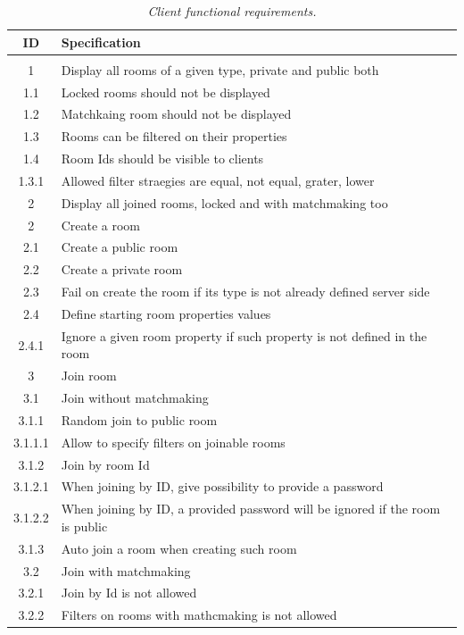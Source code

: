\begin{center}
\begin{longtable}{|c|l|} 
  \caption{\textit{Client functional requirements.}} \label{table:client-f-req} \\
 
\hline
ID   &  Specification \\
\hline
\multicolumn{2}{|c|}{} \\
\hline
1       & Display all rooms of a given type, private and public both \\
1.1     & Locked rooms should not be displayed \\
1.2     & Matchkaing room should not be displayed \\
1.3     & Rooms can be filtered on their properties \\
1.4     & Room Ids should be visible to clients \\
1.3.1   & Allowed filter straegies are equal, not equal, grater, lower \\
2       & Display all joined rooms, locked and with matchmaking too \\
2       & Create a room \\
2.1     & Create a public room \\
2.2     & Create a private room \\
2.3     & Fail on  create the room if its type is not already defined server side \\
2.4     & Define starting room properties values \\
2.4.1   & Ignore a given room property if such property is not defined in the room \\
3       & Join room \\
3.1     & Join without matchmaking \\
3.1.1   & Random join to public room \\
3.1.1.1 & Allow to specify filters on joinable rooms \\
3.1.2   & Join by room Id \\
3.1.2.1 & When joining by ID, give possibility to provide a password \\
3.1.2.2 & When joining by ID, a provided password will be ignored if the room is public \\
3.1.3   & Auto join a room when creating such room \\
3.2     & Join with matchmaking \\
3.2.1   & Join by Id is not allowed \\
3.2.2   & Filters on rooms with mathcmaking is not allowed \\

\end{longtable}
\end{center}
